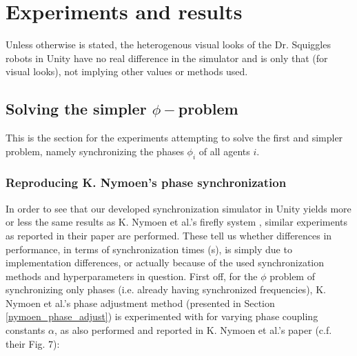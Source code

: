 \chapter{Experiments and results}
\label{chap:experiments_and_results}


Unless otherwise is stated, the heterogenous visual looks of the Dr. Squiggles robots in Unity have no real difference in the simulator and is only that (for visual looks), not implying other values or methods used.

	\section{Solving the simpler $\phi-$problem}
	This is the section for the experiments attempting to solve the first and simpler problem, namely synchronizing the phases $\phi_i$ of all agents $i$. \nl
	
	\subsection{Reproducing K. Nymoen's phase synchronization}
	In order to see that our developed synchronization simulator in Unity yields more or less the same results as K. Nymoen et al.'s firefly system \cite{nymoen_synch}, similar experiments as reported in their paper are performed. These tell us whether differences in performance, in terms of synchronization times (s), is simply due to implementation differences, or actually because of the used synchronization methods and hyperparameters in question. First off, for the $\phi$ problem of synchronizing only phases (i.e. already having synchronized frequencies), K. Nymoen et al.'s phase adjustment method (presented in Section \ref{nymoen_phase_adjust}) is experimented with for varying phase coupling constants $\alpha$, as also performed and reported in K. Nymoen et al.'s paper \cite{nymoen_synch} (c.f. their Fig. 7):  \nl
	
